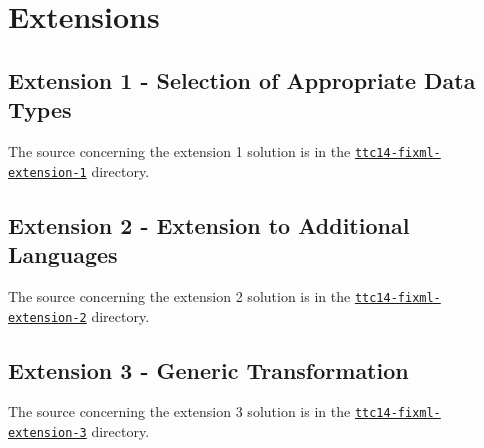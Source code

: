 
\section{Extensions}

\subsection{Extension 1 - Selection of Appropriate Data Types}
\label{sec:Extension1}


The source concerning the extension 1 solution is in the \href{https://github.com/fikovnik/ttc14-fixml-sigma/tree/master/ttc14-fixml-extension-1}{\texttt{ttc14-fixml-extension-1}} directory.


\subsection{Extension 2 - Extension to Additional Languages}
\label{sec:Extension2}



The source concerning the extension 2 solution is in the \href{https://github.com/fikovnik/ttc14-fixml-sigma/tree/master/ttc14-fixml-extension-2}{\texttt{ttc14-fixml-extension-2}} directory.


\subsection{Extension 3 - Generic Transformation}
\label{sec:Extension3}



The source concerning the extension 3 solution is in the \href{https://github.com/fikovnik/ttc14-fixml-sigma/tree/master/ttc14-fixml-extension-3}{\texttt{ttc14-fixml-extension-3}} directory.
